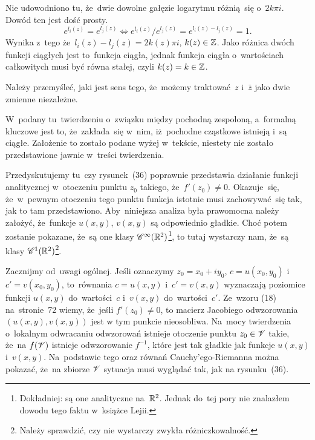 \documentclass[a4paper,11pt]{article}
\numberwithin{equation}{section}
\begin{document}
\noindent
{} Nie udowodniono tu, że~dwie dowolne gałęzie logarytmu różnią~się
o~$2 k \pi i$. Dowód ten jest dość prosty.
\begin{equation}
  \label{eq:Leja-Funkcje-zepolone-38}
  e^{ l_{ i }( z ) } = e^{ l_{ j }( z ) } \iff
  e^{ l_{ i }( z ) } / e^{ l_{ j }( z ) } = e^{ l_{ i }( z ) - l_{ j }( z ) } = 1.
\end{equation}
Wynika z~tego że~$l_{ i }( z ) - l_{ j }( z ) = 2 k( z ) \pi i$,
$k( z ) \in \mathbb{Z}$. Jako różnica dwóch funkcji ciągłych jest
to~funkcja ciągła, jednak funkcja ciągła o~wartościach całkowitych
musi być równa stałej, czyli $k( z ) = k \in \mathbb{Z}$.

\VerSpaceFour





\noindent
{} Należy przemyśleć, jaki jest sens tego, że~możemy traktować~$z$
i~$\bar{z}$ jako dwie zmienne niezależne.

\VerSpaceFour





\noindent
{} W~podany tu~twierdzeniu o~związku między pochodną zespoloną,
a~formalną kluczowe jest to, że~zakłada~się w~nim, iż~pochodne cząstkowe
istnieją i~są ciągłe. Założenie to zostało podane wyżej w~tekście, niestety
nie zostało przedstawione jawnie w~treści twierdzenia.

\VerSpaceFour





\noindent
{} Przedyskutujemy tu~czy rysunek~(36) poprawnie przedstawia
działanie funkcji analitycznej w~otoczeniu punktu $z_{ 0 }$ takiego,
że~$f'( z_{ 0 } ) \neq 0$. Okazuje~się, że~w~pewnym otoczeniu tego punktu
funkcja istotnie musi zachowywać~się tak, jak to tam przedstawiono.
Aby~niniejsza analiza była prawomocna należy założyć, że~funkcje
$u( x, y )$, $v( x, y )$ są odpowiednio gładkie. Choć potem zostanie
pokazane, że~są one klasy $\mathcal{C}^{ \infty }( \mathbb{R}^{ 2 } )$\footnote{Dokładniej:
  są one   analityczne na~$\mathbb{R}^{ 2 }$. Jednak do~tej pory nie znalazłem
  dowodu tego faktu w~książce Lejii.}, to tutaj wystarczy nam, że~są
klasy $\mathcal{C}^{ 1 }( \mathbb{R}^{ 2 } )$\footnote{Należy sprawdzić, czy nie
  wystarczy zwykła różniczkowalność.}.

Zacznijmy od~uwagi ogólnej. Jeśli oznaczymy
$z_{ 0 } = x_{ 0 } + i y_{ 0 }$, $c = u( x_{ 0 }, y_{ 0 } )$
i~$c' = v( x_{ 0 }, y_{ 0 } )$, to~równania $c = u( x, y )$
i~$c' = v( x, y )$ wyznaczają poziomice funkcji $u( x, y )$
do~wartości~$c$ i~$v( x, y )$ do~wartości~$c'$. Ze~wzoru (18)
na~stronie~72 wiemy, że~jeśli $f'( z_{ 0 } ) \neq 0$, to macierz
Jacobiego odwzorowania $( u( x, y ), v( x, y ) )$ jest w tym punkcie
nieosobliwa. Na~mocy twierdzenia o~lokalnym odwracaniu odwzorowań
istnieje otoczenie punktu $z_{ 0 } \in \mathcal{V}$ takie, że~na
$f( \mathcal{V} )$ istnieje odwzorowanie $f^{ -1 }$, które jest tak
gładkie jak funkcje $u( x, y )$ i~$v( x, y )$. Na~podstawie tego
oraz równań Cauchy'ego-Riemanna można pokazać, że~na zbiorze $\mathcal{V}$
sytuacja musi wyglądać tak, jak na rysunku~(36).
\end{document}
